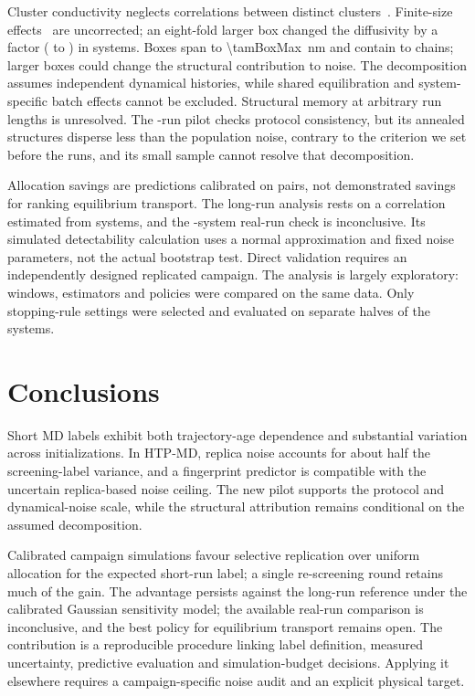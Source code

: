 \documentclass[preprint,12pt]{elsarticle}
\begin{document}
Cluster conductivity neglects correlations between distinct clusters~\cite{FranceLanord2019NernstEinstein}.
Finite-size effects~\cite{Yeh2004SystemSize} are uncorrected; an eight-fold larger box changed
the diffusivity by a factor \ampEndBoxRatio{} (\ampEndBoxRatioLo{} to \ampEndBoxRatioHi) in \ampBoxN{}
systems. Boxes span \tamBoxMin{} to
\SI{\tamBoxMax}{\nano\metre} and contain \tamChainsMin{} to \tamChainsMax{} chains; larger
boxes could change the structural contribution to noise. The decomposition assumes independent
dynamical histories, while shared equilibration and system-specific batch effects cannot be
excluded. Structural memory at arbitrary run lengths is unresolved. The \pilRuns{}-run pilot
checks protocol consistency, but its annealed structures disperse less than the population noise,
contrary to the criterion we set before the runs, and its small sample cannot resolve that
decomposition.

Allocation savings are predictions calibrated on \nRep{} pairs, not demonstrated savings for
ranking equilibrium transport. The long-run analysis rests on a correlation estimated from \olN{} systems,
and the \valAlNCamp{}-system real-run check is inconclusive. Its simulated detectability
calculation uses a normal approximation and fixed noise parameters, not the actual bootstrap
test. Direct validation requires an independently designed replicated campaign. The analysis is largely
exploratory: windows, estimators and policies were compared on the same data. Only stopping-rule
settings were selected and evaluated on separate halves of the systems.

\section{Conclusions}\label{sec:conclusion}
Short MD labels exhibit both trajectory-age dependence and substantial variation across
initializations. In HTP-MD, replica noise accounts for about half the screening-label variance,
and a fingerprint predictor is compatible with the uncertain replica-based noise ceiling. The new pilot
supports the protocol and dynamical-noise scale, while the structural attribution remains
conditional on the assumed decomposition.

Calibrated campaign simulations favour selective replication over uniform allocation for the
expected short-run label; a single re-screening round retains much of the gain. The advantage
persists against the long-run reference under the calibrated Gaussian sensitivity model;
the available real-run comparison is inconclusive, and the best policy
for equilibrium transport remains open.
The contribution is a reproducible procedure linking label definition, measured uncertainty,
predictive evaluation and simulation-budget decisions. Applying it elsewhere requires a
campaign-specific noise audit and an explicit physical target.
\end{document}
